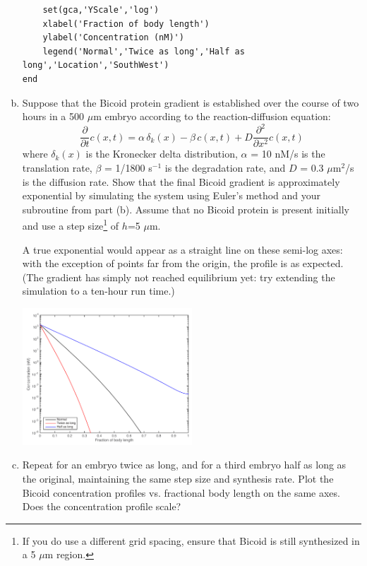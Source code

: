 \documentclass{article}
\begin{document}
\begin{enumerate}[a)]
\begin{lstlisting}
    set(gca,'YScale','log')
    xlabel('Fraction of body length')
    ylabel('Concentration (nM)')
    legend('Normal','Twice as long','Half as long','Location','SouthWest')
end
\end{lstlisting}

\item Suppose that the Bicoid protein gradient is established over the course of two hours in a 500 $\mu$m embryo according to the reaction-diffusion equation:
\[  \frac{\partial}{\partial t} c(x,t) =  \alpha \, \delta_k(x) - \beta \, c(x,t) + D \frac{\partial^2}{\partial x^2}  c(x,t) \]
where $\delta_k(x)$ is the Kronecker delta distribution, $\alpha$ = 10 nM/s is the translation rate, $\beta$ = 1/1800 s$^{-1}$ is the degradation rate, and $D$ = 0.3 $\mu$m$^2$/s is the diffusion rate. Show that the final Bicoid gradient is approximately exponential by simulating the system using  Euler's method and your subroutine from part (b). Assume that no Bicoid protein is present initially and use a step size\footnote{If you do use a different grid spacing, ensure that Bicoid is still synthesized in a 5 $\mu$m region.} of $h$=5 $\mu$m.

{\color{red}
A true exponential would appear as a straight line on these semi-log axes: with the exception of points far from the origin, the profile is as expected. (The gradient has simply not reached equilibrium yet: try extending the simulation to a ten-hour run time.)
}

\begin{center}
\includegraphics[width=0.5\textwidth]{prob1d.pdf}
\end{center}

\item Repeat for an embryo twice as long, and for a third embryo half as long as the original, maintaining the same step size and synthesis rate. Plot the Bicoid concentration profiles vs. fractional body length on the same axes. Does the concentration profile scale?\\


\end{enumerate}
\end{document}
